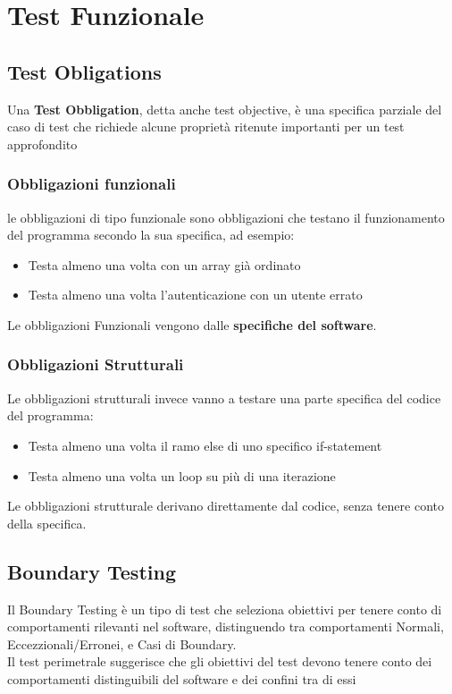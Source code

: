 \chapter{Test Funzionale}
\section{Test Obligations}
Una \textbf{Test Obbligation}, detta anche test objective, è una specifica parziale del caso di test che richiede alcune proprietà ritenute importanti per un test approfondito

\subsection{Obbligazioni funzionali} le obbligazioni di tipo funzionale sono obbligazioni che testano 
il funzionamento del programma secondo la sua specifica, ad esempio:
\begin{itemize}
    \item Testa almeno una volta con un array già ordinato
    \item Testa almeno una volta l'autenticazione con un utente errato
\end{itemize}
Le obbligazioni Funzionali vengono dalle \textbf{specifiche del software}.

\subsection{Obbligazioni Strutturali}
Le obbligazioni strutturali invece vanno a testare una parte specifica del codice del programma:

\begin{itemize}
    \item Testa almeno una volta il ramo else di uno specifico if-statement
    \item Testa almeno una volta un loop su più di una iterazione
\end{itemize}
Le obbligazioni strutturale derivano direttamente dal codice, senza tenere conto della specifica.

\section{Boundary Testing}
Il Boundary Testing è un tipo di test che seleziona obiettivi per tenere conto di comportamenti 
rilevanti nel software, distinguendo tra comportamenti Normali, Eccezzionali/Erronei, e Casi di Boundary.
\\Il test perimetrale suggerisce che gli obiettivi del test devono tenere conto dei comportamenti distinguibili del software e dei confini tra di essi

